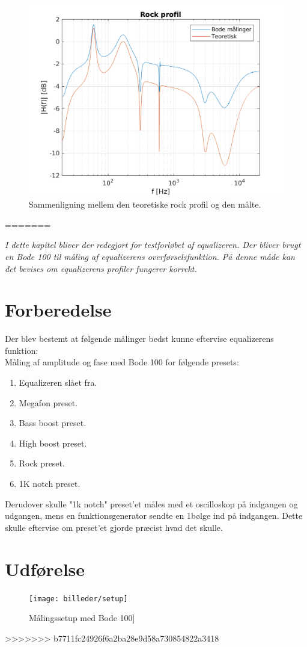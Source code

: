 \begin{figure}[h]
\includegraphics[]{matlabdemo/test/eq_rock.png}
\caption{Sammenligning mellem den teoretiske rock profil og den målte.}
\end{figure}

=======

\emph{I dette kapitel bliver der redegjort for testforløbet af equalizeren. Der bliver brugt en Bode 100 til måling af equalizerens overførselsfunktion. På denne måde kan det bevises om equalizerens profiler fungerer korrekt.}

\section{Forberedelse}
Der blev bestemt at følgende målinger bedst kunne eftervise equalizerens funktion: \\

Måling af amplitude og fase med Bode 100 for følgende presets:
\begin{enumerate}
    \item Equalizeren slået fra.
    \item Megafon preset.
    \item Bass boost preset.
    \item High boost preset.
    \item Rock preset. 
    \item 1K notch preset. \\
\end{enumerate}


Derudover skulle "1k notch" preset'et måles med et oscilloskop på indgangen og udgangen, mens en funktionsgenerator sendte en $1$\kilo\hertz bølge ind på indgangen. Dette skulle eftervise om preset'et gjorde præcist hvad det skulle. \\

\section{Udførelse}
\begin{figure}[h!]
	\centering
	\texttt{[image: billeder/setup]}
	\caption{Målingssetup med Bode 100]}
	\label{fig:bode100}
\end{figure}
>>>>>>> b7711fc24926f6a2ba28e9d58a730854822a3418
